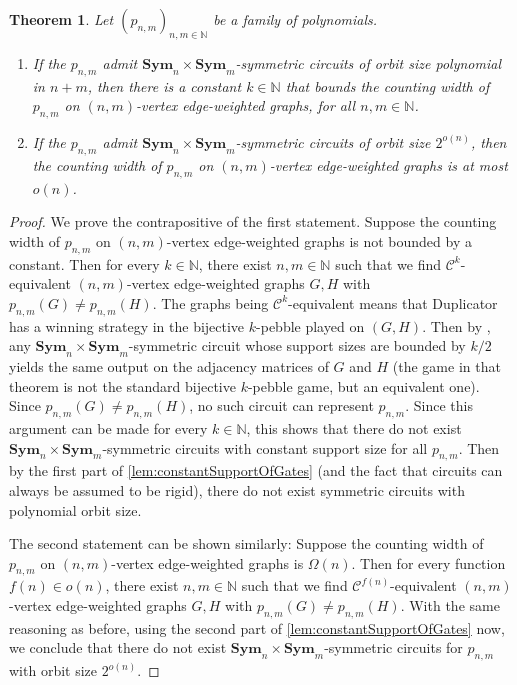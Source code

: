 \documentclass[11pt, DIV=15]{scrarticle}
\theoremstyle{definition}
\theoremstyle{plain}
\newtheorem{theorem}[definition]{Theorem}
\theoremstyle{remark}
\newcommand{\Sym}{\mathbf{Sym}}
\newcommand{\bbN}{\mathbb{N}}
\begin{document}
	\begin{theorem}\label{thm:counting-width}
		Let $(p_{n,m})_{n,m\in \mathbb{N}}$ be a family of polynomials.
		\begin{enumerate}
			\item If the $p_{n,m}$ admit $\Sym_n \times \Sym_m$-symmetric circuits of orbit size polynomial in $n+m$,
			then there is a constant $k \in \bbN$ that bounds the counting width of $p_{n,m}$ on $(n,m)$-vertex edge-weighted graphs, for all $n,m \in \bbN$.
			\item If the $p_{n,m}$ admit $\Sym_n \times \Sym_m$-symmetric circuits of orbit size $2^{o(n)}$, then the counting width of $p_{n,m}$ on $(n,m)$-vertex edge-weighted graphs is at most $o(n)$.
		\end{enumerate}
	\end{theorem}
	\begin{proof} 
		We prove the contrapositive of the first statement. Suppose the counting width of $p_{n,m}$ on $(n,m)$-vertex edge-weighted graphs is not bounded by a constant. Then for every $k \in \bbN$, there exist $n,m \in \bbN$ such that we find $\mathcal{C}^{k}$-equivalent $(n,m)$-vertex edge-weighted graphs $G,H$ with $p_{n,m}(G) \neq p_{n,m}(H)$.
		The graphs being $\mathcal{C}^{k}$-equivalent means that Duplicator has a winning strategy in the bijective $k$-pebble played on $(G,H)$. Then by \cite[Theorem~4.8]{dawar2021lower}, any $\Sym_n \times \Sym_m$-symmetric circuit whose support sizes are bounded by $k/2$ yields the same output on the adjacency matrices of $G$ and $H$ (the game in that theorem is not the standard bijective $k$-pebble game, but an equivalent one). Since $p_{n,m}(G) \neq p_{n,m}(H)$, no such circuit can represent $p_{n,m}$. Since this argument can be made for every $k \in \bbN$, this shows that there do not exist $\Sym_n \times \Sym_m$-symmetric circuits with constant support size for all $p_{n,m}$.
		Then by the first part of \cref{lem:constantSupportOfGates} (and the fact that circuits can always be assumed to be rigid), there do not exist symmetric circuits with polynomial orbit size.
		
		The second statement can be shown similarly: Suppose the counting width of $p_{n,m}$ on $(n,m)$-vertex edge-weighted graphs is $\Omega(n)$. Then for every function $f(n) \in o(n)$, there exist $n,m \in \bbN$ such that we find $\mathcal{C}^{f(n)}$-equivalent $(n,m)$-vertex edge-weighted graphs $G,H$ with $p_{n,m}(G) \neq p_{n,m}(H)$. With the same reasoning as before, using the second part of \cref{lem:constantSupportOfGates} now, we conclude that there do not exist $\Sym_n \times \Sym_m$-symmetric circuits for $p_{n,m}$ with orbit size $2^{o(n)}$.
	\end{proof}	
	
\end{document}
